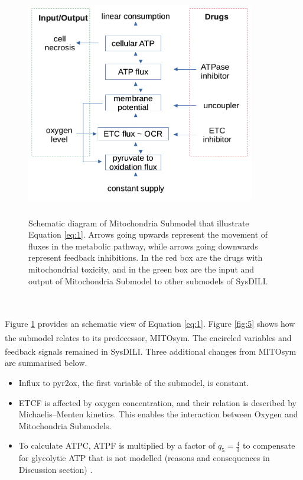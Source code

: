 \documentclass[12pt]{article}
\begin{document}
\begin{figure}[h!]
\centering
\includegraphics[width = 10cm, height = 10cm]{mito_schematic.png}
\caption{Schematic diagram of Mitochondria Submodel that illustrate Equation \ref{eq:1}. Arrows going upwards represent the movement of fluxes in the metabolic pathway, while arrows going downwards represent feedback inhibitions. In the red box are the drugs with mitochondrial toxicity, and in the green box are the input and output of Mitochondria Submodel to other submodels of SysDILI. }
\label{fig:6}
\end{figure}\\\\Figure \ref{fig:6} provides an schematic view of Equation \ref{eq:1}. Figure \ref{fig:5} shows how the submodel relates to its predecessor, MITOsym\textsuperscript{\textregistered}. The encircled variables and feedback signals remained in SysDILI. Three additional changes from MITOsym\textsuperscript{\textregistered} are summarised below.
\begin{itemize}
\item Influx to pyr2ox, the first variable of the submodel, is constant.
\item ETCF is affected by oxygen concentration, and their relation is described by Michaelis–Menten kinetics. This enables the interaction between Oxygen and Mitochondria Submodels.
\item To calculate ATPC, ATPF is multiplied by a factor of $q_5=\frac{4}{3}$ to compensate for glycolytic ATP that is not modelled (reasons and consequences in Discussion section) . 
\end{itemize}
\end{document}

